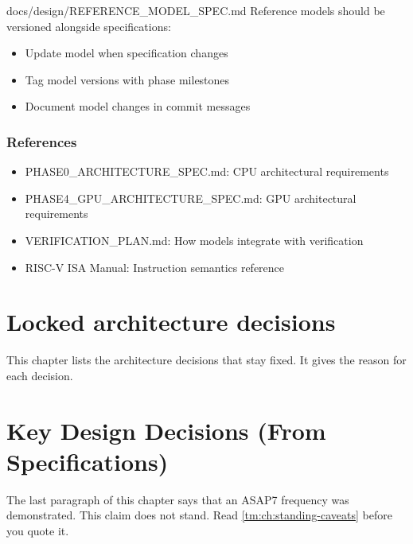 \begin{relocated}{docs/design/REFERENCE_MODEL_SPEC.md}
Reference models should be versioned alongside specifications:

\begin{itemize}
\tightlist
\item
  Update model when specification changes
\item
  Tag model versions with phase milestones
\item
  Document model changes in commit messages
\end{itemize}

\subsection{References}\label{ds:ch:reference-model:references}

\begin{itemize}
\tightlist
\item
  PHASE0\_\allowbreak{}ARCHITECTURE\_\allowbreak{}SPEC.md: CPU
  architectural requirements
\item
  PHASE4\_\allowbreak{}GPU\_\allowbreak{}ARCHITECTURE\_\allowbreak{}SPEC.md:
  GPU architectural requirements
\item
  VERIFICATION\_\allowbreak{}PLAN.md: How models integrate with
  verification
\item
  RISC-V ISA Manual: Instruction semantics reference
\end{itemize}
\end{relocated}

\chapter{Locked architecture decisions}\label{ds:ch:locked-architecture-decisions}

This chapter lists the architecture decisions that stay fixed. It gives the reason for each decision.

\chapter{Key Design Decisions (From Specifications)}\label{ds:dec:key-design-decisions}

\begin{information}
The last paragraph of this chapter says that an ASAP7 frequency was demonstrated. This claim does not stand. Read \cref{tm:ch:standing-caveats} before you quote it.
\end{information}

